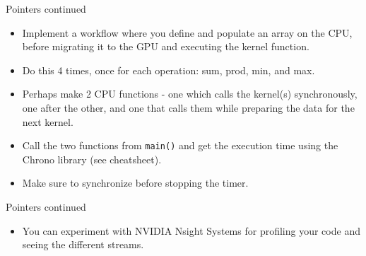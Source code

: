 \documentclass[11pt,t]{beamer}
\newcommand{\inline}[1]{ \colorbox{mygray}{\lstinline{#1}}}
\begin{document}
\begin{frame}[fragile]{Pointers continued}

\begin{itemize}\setlength\itemsep{0.75em}
    \item Implement a workflow where you define and populate an array on the CPU, before migrating it to the GPU and executing the kernel function.
    \item Do this 4 times, once for each operation: sum, prod, min, and max.
    \item Perhaps make 2 CPU functions - one which calls the kernel(s) synchronously, one after the other, and one that calls them while preparing the data for the next kernel.
    \item Call the two functions from \inline{main()} and get the execution time using the Chrono library (see cheatsheet).
    \item Make sure to synchronize before stopping the timer.
\end{itemize}

\end{frame}
\begin{frame}[fragile]{Pointers continued}

\begin{itemize}\setlength\itemsep{0.75em}
    \item You can experiment with NVIDIA Nsight Systems for profiling your code and seeing the different streams.
\end{itemize}

\end{frame}
\end{document}
